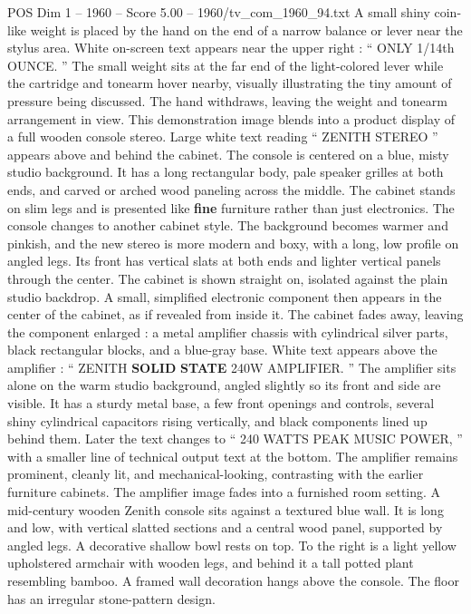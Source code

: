 \begin{textsample}{POS Dim 1 – 1960 – Score 5.00 – 1960/tv\_com\_1960\_94.txt}
A small shiny coin-like weight is placed by the hand on the end of a narrow balance or lever near the stylus area.
White on-screen text appears near the upper right : “ ONLY 1/14th OUNCE. ” The small weight sits at the far end of the light-colored lever while the cartridge and tonearm hover nearby, visually illustrating the tiny amount of pressure being discussed.
The hand withdraws, leaving the weight and tonearm arrangement in view.
This demonstration image blends into a product display of a full wooden console stereo.
Large white text reading “ ZENITH STEREO ” appears above and behind the cabinet.
The console is centered on a blue, misty studio background.
It has a long rectangular body, pale speaker grilles at both ends, and carved or arched wood paneling across the middle.
The cabinet stands on slim legs and is presented like \textbf{fine} furniture rather than just electronics.
The console changes to another cabinet style.
The background becomes warmer and pinkish, and the new stereo is more modern and boxy, with a long, low profile on angled legs.
Its front has vertical slats at both ends and lighter vertical panels through the center.
The cabinet is shown straight on, isolated against the plain studio backdrop.
A small, simplified electronic component then appears in the center of the cabinet, as if revealed from inside it.
The cabinet fades away, leaving the component enlarged : a metal amplifier chassis with cylindrical silver parts, black rectangular blocks, and a blue-gray base.
White text appears above the amplifier : “ ZENITH \textbf{SOLID} \textbf{STATE} 240W AMPLIFIER. ” The amplifier sits alone on the warm studio background, angled slightly so its front and side are visible.
It has a sturdy metal base, a few front openings and controls, several shiny cylindrical capacitors rising vertically, and black components lined up behind them.
Later the text changes to “ 240 WATTS PEAK MUSIC POWER, ” with a smaller line of technical output text at the bottom.
The amplifier remains prominent, cleanly lit, and mechanical-looking, contrasting with the earlier furniture cabinets.
The amplifier image fades into a furnished room setting.
A mid-century wooden Zenith console sits against a textured blue wall.
It is long and low, with vertical slatted sections and a central wood panel, supported by angled legs.
A decorative shallow bowl rests on top.
To the right is a light yellow upholstered armchair with wooden legs, and behind it a tall potted plant resembling bamboo.
A framed wall decoration hangs above the console.
The floor has an irregular stone-pattern design.

\end{textsample}
